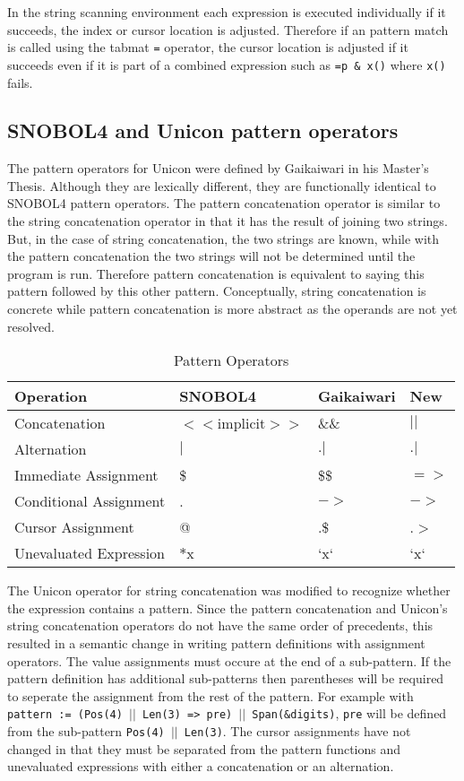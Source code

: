 \documentclass{article}
\begin{document}
In the string scanning environment each expression is executed individually if it succeeds, the index or cursor location is adjusted.  Therefore if an pattern match is called using the tabmat \texttt{=} operator, the cursor location is adjusted if it succeeds even if it is part of a combined expression such as \texttt{=p \& x()} where \texttt{x()} fails.
\subsection{SNOBOL4 and Unicon pattern operators}
The pattern operators for Unicon were defined by Gaikaiwari in his Master's Thesis.  Although they are lexically different, they are functionally identical to SNOBOL4 pattern operators.  The pattern concatenation operator is similar to the string concatenation operator in that it has the result of joining two strings.  But, in the case of string concatenation, the two strings are known, while with the pattern concatenation the two strings will not be determined until the program is run.  Therefore pattern concatenation is equivalent to saying this pattern followed by this other pattern.  Conceptually, string concatenation is concrete while pattern concatenation is more abstract as the operands are not yet resolved.  

\begin{table}[ht]
	\caption{Pattern Operators}
	\centering
	\begin{tabular}{|l|l|l|l|}
		\hline\hline
		Operation & SNOBOL4 & Gaikaiwari & New\\
		\hline
		Concatenation & $<<$implicit$>>$ & \&\& & $||$ \\
		Alternation & $|$ & $.|$ & $.|$ \\
		\hline
		Immediate Assignment & \$ & \$\$ & $=>$ \\
		Conditional Assignment & . & $->$ & $->$\\
		Cursor Assignment & @ & .\$ & .$>$ \\
		\hline
		Unevaluated Expression & $*$x & `x` & `x` \\
		\hline
	\end{tabular}
\end{table}
The Unicon operator for string concatenation was modified to recognize whether the expression contains a pattern.  Since the pattern concatenation and Unicon's string concatenation operators do not have the same order of precedents, this resulted in a semantic change in writing pattern definitions with assignment operators.  The value assignments must occure at the end of a sub-pattern.  If the pattern definition has additional sub-patterns then parentheses will be required to seperate the assignment from the rest of the pattern.  For example with \texttt{pattern := (Pos(4) $||$ Len(3) => pre) $||$ Span(\&digits)}, \texttt{pre} will be defined from the sub-pattern \texttt{Pos(4) $||$ Len(3)}.  The cursor assignments have not changed in that they must be separated from the pattern functions and unevaluated expressions with either a concatenation or an alternation.
\end{document}
